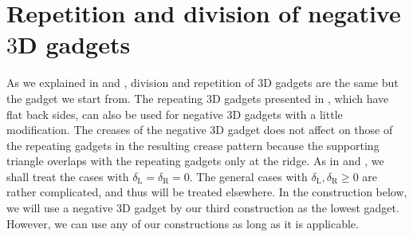 \documentclass[11pt]{amsart}
\numberwithin{equation}{section}
\numberwithin{theorem}{section}
\newcommand{\Lt}{\ensuremath{\mathrm{L}}}
\newcommand{\Rt}{\ensuremath{\mathrm{R}}}
\begin{document}
\section{Repetition and division of negative $3$D gadgets}\label{sec:repetition}
As we explained in \cite{Doi19} and \cite{Doi20}, division and repetition of $3$D gadgets are the same but the gadget we start from.
The repeating $3$D gadgets presented in \cite{Doi20}, which have flat back sides, can also be used for negative $3$D gadgets with a little modification.
The creases of the negative $3$D gadget does not affect on those of the repeating gadgets in the resulting crease pattern
because the supporting triangle overlaps with the repeating gadgets only at the ridge.
As in \cite{Doi19} and \cite{Doi20}, we shall treat the cases with $\delta_\Lt =\delta_\Rt =0$.
The general cases with $\delta_\Lt ,\delta_\Rt\geqslant 0$ are rather complicated, and thus will be treated elsewhere.
In the construction below, we will use a negative $3$D gadget by our third construction as the lowest gadget.
However, we can use any of our constructions as long as it is applicable.
\end{document}
